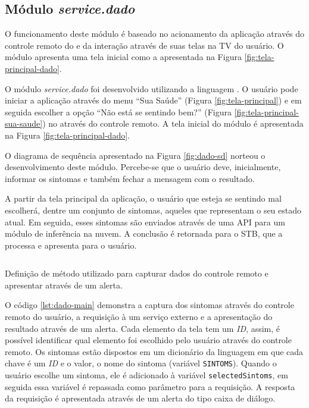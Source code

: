 \subsection{Módulo \textit{service.dado}}\label{subsubsec:dado}

O funcionamento deste módulo é baseado no acionamento da aplicação através
do controle remoto do \stb[] e da interação através de suas telas na TV
do usuário. O módulo apresenta uma tela inicial como a apresentada na 
Figura \vref{fig:tela-principal-dado}.

O módulo \textit{service.dado} foi desenvolvido utilizando a linguagem
\python[]. O usuário pode iniciar a aplicação através do menu ``Sua Saúde''
(Figura \vref{fig:tela-principal}) e em seguida escolher a opção ``Não está se
sentindo bem?'' (Figura \vref{fig:tela-principal-sua-saude}) no \stb[] através
do controle remoto. A tela inicial do módulo é  apresentada na Figura
\vref{fig:tela-principal-dado}.

O diagrama de sequência apresentado na Figura \ref{fig:dado-sd} norteou
o desenvolvimento deste módulo. Percebe-se que o usuário deve, inicialmente,
informar os sintomas e também fechar a mensagem com o resultado.


A partir da tela principal da aplicação, o usuário que esteja se sentindo mal escolherá,
dentre um conjunto de sintomas, aqueles que representam o seu estado atual. Em
seguida, esses sintomas são enviados através de uma API para um
módulo de inferência na nuvem. A conclusão é retornada para o STB, que a processa e 
apresenta para o usuário.

\begin{listing}[ht!]
\inputminted{python}{codigos/dado-main.py}
\caption{Definição de método utilizado para capturar dados do controle remoto
e apresentar através de um alerta.}
\label{lst:dado-main}
\end{listing}

O código \ref{lst:dado-main} demonstra a captura dos sintomas através do
controle remoto do usuário, a requisição à um serviço externo e a apresentação
do resultado através de um alerta. Cada elemento da tela tem um \textit{ID},
assim, é possível identificar qual elemento foi escolhido pelo usuário através
do controle remoto.  Os sintomas estão dispostos em um dicionário da linguagem
\python[] em que cada chave é um \textit{ID} e o valor, o nome do sintoma
(variável \texttt{SINTOMS}). Quando o usuário escolhe um sintoma, ele 
é adicionado à variável \texttt{selectedSintoms}, em seguida essa variável é
repassada como parâmetro para a requisição. A resposta da requisição é apresentada
através de um alerta do tipo caixa de diálogo.

